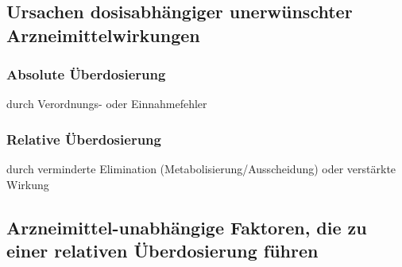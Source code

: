 \documentclass[10pt,a4paper]{report}
\begin{document}
\subsection{Ursachen dosisabhängiger unerwünschter Arzneimittelwirkungen}
\subsubsection{Absolute Überdosierung} durch Verordnungs- oder Einnahmefehler
\subsubsection{Relative Überdosierung} durch verminderte Elimination (Metabolisierung/Ausscheidung) oder verstärkte Wirkung
\subsection{Arzneimittel-unabhängige Faktoren, die zu einer relativen Überdosierung führen}
\end{document}
